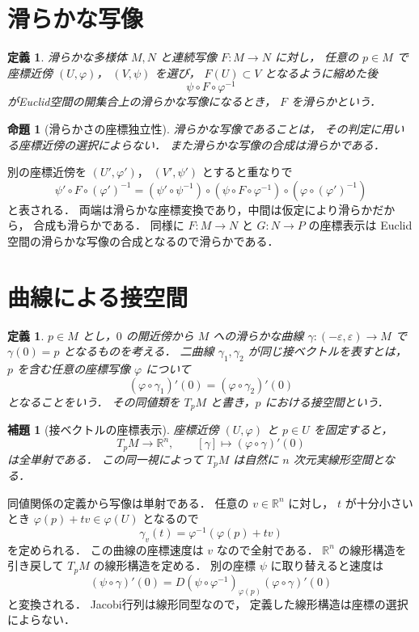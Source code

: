 \documentclass[a5paper,10pt,onecolumn]{jsarticle}
\makeatletter
\theoremstyle{mathnotetheorem}
\newtheorem{definition}[theorem]{定義}
\newtheorem{lemma}[theorem]{補題}
\newtheorem{proposition}[theorem]{命題}
\renewcommand{\proofname}{証明}
\renewenvironment{proof}[1][\proofname]{%
  \par\pushQED{\qed}\normalfont\topsep4\p@\@plus2\p@\relax
  \trivlist\item[\hskip\labelsep\bfseries #1]\ignorespaces
}{\popQED\endtrivlist\@endpefalse}
\makeatother
\begin{document}
\section{滑らかな写像}

\begin{definition}
滑らかな多様体 $M,N$ と連続写像 $F:M\to N$ に対し，
任意の $p\in M$ で座標近傍 $(U,\varphi)$，
$(V,\psi)$ を選び，
$F(U)\subset V$ となるように縮めた後
\[
 \psi\circ F\circ\varphi^{-1}
\]
がEuclid空間の開集合上の滑らかな写像になるとき，
$F$ を滑らかという．
\end{definition}

\begin{proposition}[滑らかさの座標独立性]
\label{prop:map-independence}
滑らかな写像であることは，
その判定に用いる座標近傍の選択によらない．
また滑らかな写像の合成は滑らかである．
\end{proposition}
\begin{proof}
別の座標近傍を $(U',\varphi')$，
$(V',\psi')$ とすると重なりで
\[
 \psi'\circ F\circ(\varphi')^{-1}
 =(\psi'\circ\psi^{-1})
 \circ(\psi\circ F\circ\varphi^{-1})
 \circ(\varphi\circ(\varphi')^{-1})
\]
と表される．
両端は滑らかな座標変換であり，中間は仮定により滑らかだから，
合成も滑らかである．
同様に $F:M\to N$ と $G:N\to P$ の座標表示は
Euclid空間の滑らかな写像の合成となるので滑らかである．
\end{proof}

\section{曲線による接空間}

\begin{definition}
$p\in M$ とし，$0$ の開近傍から $M$ への滑らかな曲線
$\gamma:(-\varepsilon,\varepsilon)\to M$ で
$\gamma(0)=p$ となるものを考える．
二曲線 $\gamma_1,\gamma_2$ が同じ接ベクトルを表すとは，
$p$ を含む任意の座標写像 $\varphi$ について
\[
 (\varphi\circ\gamma_1)'(0)
 =(\varphi\circ\gamma_2)'(0)
\]
となることをいう．
その同値類を $T_pM$ と書き，$p$ における接空間という．
\end{definition}

\begin{lemma}[接ベクトルの座標表示]\label{lem:tangent-coord}
座標近傍 $(U,\varphi)$ と $p\in U$ を固定すると，
\[
 T_pM\longrightarrow\mathbb R^n,\qquad
 [\gamma]\longmapsto(\varphi\circ\gamma)'(0)
\]
は全単射である．
この同一視によって $T_pM$ は自然に
$n$ 次元実線形空間となる．
\end{lemma}
\begin{proof}
同値関係の定義から写像は単射である．
任意の $v\in\mathbb R^n$ に対し，
$t$ が十分小さいとき
$\varphi(p)+tv\in\varphi(U)$ となるので
\[
 \gamma_v(t)=\varphi^{-1}(\varphi(p)+tv)
\]
を定められる．
この曲線の座標速度は $v$ なので全射である．
$\mathbb R^n$ の線形構造を引き戻して
$T_pM$ の線形構造を定める．
別の座標 $\psi$ に取り替えると速度は
\[
 (\psi\circ\gamma)'(0)
 =D(\psi\circ\varphi^{-1})_{\varphi(p)}
  (\varphi\circ\gamma)'(0)
\]
と変換される．
Jacobi行列は線形同型なので，
定義した線形構造は座標の選択によらない．
\end{proof}
\end{document}
